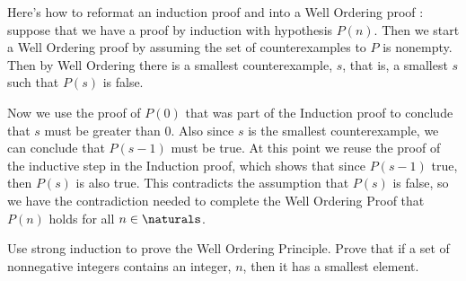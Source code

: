 \begin{editingnotes}
Here's how to reformat an induction proof and into a Well
Ordering proof : suppose that we have a proof by induction with
hypothesis $P(n)$.  Then we start a Well Ordering proof by assuming the
set of counterexamples to $P$ is nonempty.  Then by Well Ordering there is
a smallest counterexample, $s$, that is, a smallest $s$ such that $P(s)$
is false.

Now we use the proof of $P(0)$ that was part of the Induction proof to
conclude that $s$ must be greater than 0.  Also since $s$ is the smallest
counterexample, we can conclude that $P(s-1)$ must be true.  At this point
we reuse the proof of the inductive step in the Induction proof, which
shows that since $P(s-1)$ true, then $P(s)$ is also true.  This
contradicts the assumption that $P(s)$ is false, so we have the
contradiction needed to complete the Well Ordering Proof that $P(n)$ holds
for all $n \in \naturals$.

\end{editingnotes}


\begin{editingnotes}
\begin{notesproblem}
Use strong induction to prove the Well Ordering Principle. \hint Prove
that if a set of nonnegative integers contains an integer, $n$, then it
has a smallest element.
\end{notesproblem}
\end{editingnotes}

\endinput

